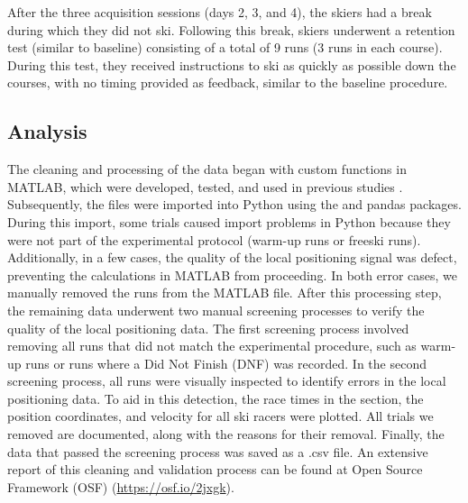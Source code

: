\documentclass{article}
\begin{document}
After the three acquisition sessions (days 2, 3, and 4), the skiers had a break during which they did not ski. Following this break, skiers underwent a retention test (similar to baseline) consisting of a total of 9 runs (3 runs in each course). During this test, they received instructions to ski as quickly as possible down the courses, with no timing provided as feedback, similar to the baseline procedure.


\subsection{Analysis}
The cleaning and processing of the data began with custom functions in MATLAB, which were developed, tested, and used in previous studies \cite{reid_kinematic_2010}. Subsequently, the files were imported into Python using the \cite{virtanen_scipy_2020} and pandas \cite{mckinney_pandas-powerful_2015} packages. During this import, some trials caused import problems in Python because they were not part of the experimental protocol (warm-up runs or freeski runs). Additionally, in a few cases, the quality of the local positioning signal was defect, preventing the calculations in MATLAB from proceeding. In both error cases, we manually removed the runs from the MATLAB file. After this processing step, the remaining data underwent two manual screening processes to verify the quality of the local positioning data. The first screening process involved removing all runs that did not match the experimental procedure, such as warm-up runs or runs where a Did Not Finish (DNF) was recorded. In the second screening process, all runs were visually inspected to identify errors in the local positioning data. To aid in this detection, the race times in the section, the position coordinates, and velocity for all ski racers were plotted. All trials we removed are documented, along with the reasons for their removal. Finally, the data that passed the screening process was saved as a .csv file. An extensive report of this cleaning and validation process can be found at Open Source Framework (OSF)  (\url{https://osf.io/2jxgk}).
\end{document}
